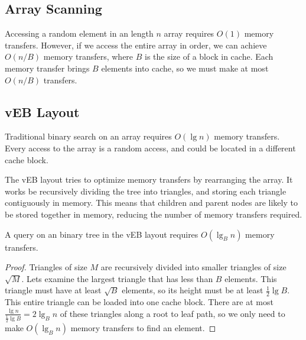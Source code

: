 \subsection*{Array Scanning}
Accessing a random element in an length $n$ array requires $O(1)$ memory transfers. However, if we access the entire array in order, we can achieve $O(n/B)$ memory transfers, where $B$ is the size of a block in cache. Each memory transfer brings $B$ elements into cache, so we must make at most $O(n/B)$ transfers.

\subsection*{vEB Layout}
Traditional binary search on an array requires $O(\lg n)$ memory transfers. Every access to the array is a random access, and could be located in a different cache block. 

The vEB layout tries to optimize memory transfers by rearranging the array. It works be recursively dividing the tree into triangles, and storing each triangle contiguously in memory. This means that children and parent nodes are likely to be stored together in memory, reducing the number of memory transfers required. 

\begin{lemma}
A query on an binary tree in the vEB layout requires $O(\lg_B n)$ memory transfers. 
\end{lemma}

\begin{proof}
Triangles of size $M$ are recursively divided into smaller triangles of size $\sqrt{M}$. Lets examine the largest triangle that has less than $B$ elements. This triangle must have at least $\sqrt{B}$ elements, so its height must be at least $\frac{1}{2}\lg B$. This entire triangle can be loaded into one cache block. There are at most $\frac{\lg n}{\frac{1}{2}\lg B} = 2 \lg_B n$ of these triangles along a root to leaf path, so we only need to make $O(\lg_B n)$ memory transfers to find an element.
\end{proof}
